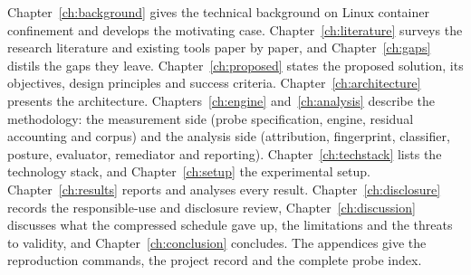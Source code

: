 Chapter~\ref{ch:background} gives the technical background on Linux container confinement and develops the motivating case. Chapter~\ref{ch:literature} surveys the research literature and existing tools paper by paper, and Chapter~\ref{ch:gaps} distils the gaps they leave. Chapter~\ref{ch:proposed} states the proposed solution, its objectives, design principles and success criteria. Chapter~\ref{ch:architecture} presents the architecture. Chapters~\ref{ch:engine} and~\ref{ch:analysis} describe the methodology: the measurement side (probe specification, engine, residual accounting and corpus) and the analysis side (attribution, fingerprint, classifier, posture, evaluator, remediator and reporting). Chapter~\ref{ch:techstack} lists the technology stack, and Chapter~\ref{ch:setup} the experimental setup. Chapter~\ref{ch:results} reports and analyses every result. Chapter~\ref{ch:disclosure} records the responsible-use and disclosure review, Chapter~\ref{ch:discussion} discusses what the compressed schedule gave up, the limitations and the threats to validity, and Chapter~\ref{ch:conclusion} concludes. The appendices give the reproduction commands, the project record and the complete probe index.
